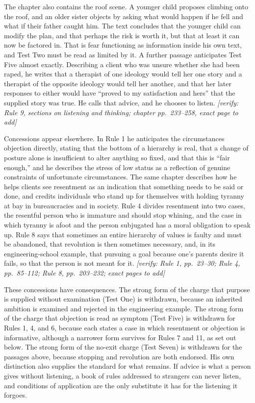 \documentclass[12pt]{article}
\newif\ifverify\verifytrue
\newcommand{\passage}[1]{\ifverify{\footnotesize\color{gray}\textit{[verify: #1]}}\fi}
\begin{document}
The chapter also contains the roof scene. A younger child proposes climbing onto the roof, and an older sister objects by asking what would happen if he fell and what if their father caught him. The text concludes that the younger child can modify the plan, and that perhaps the risk is worth it, but that at least it can now be factored in. That is fear functioning as information inside his own text, and Test Two must be read as limited by it. A further passage anticipates Test Five almost exactly. Describing a client who was unsure whether she had been raped, he writes that a therapist of one ideology would tell her one story and a therapist of the opposite ideology would tell her another, and that her later responses to either would have ``proved to my satisfaction and hers'' that the supplied story was true. He calls that advice, and he chooses to listen. \passage{Rule 9, sections on listening and thinking; chapter pp.~233--258, exact page to add}

Concessions appear elsewhere. In Rule 1 he anticipates the circumstances objection directly, stating that the bottom of a hierarchy is real, that a change of posture alone is insufficient to alter anything so fixed, and that this is ``fair enough,'' and he describes the stress of low status as a reflection of genuine constraints of unfortunate circumstances. The same chapter describes how he helps clients see resentment as an indication that something needs to be said or done, and credits individuals who stand up for themselves with holding tyranny at bay in bureaucracies and in society. Rule 4 divides resentment into two cases, the resentful person who is immature and should stop whining, and the case in which tyranny is afoot and the person subjugated has a moral obligation to speak up. Rule 8 says that sometimes an entire hierarchy of values is faulty and must be abandoned, that revolution is then sometimes necessary, and, in its engineering-school example, that pursuing a goal because one's parents desire it fails, so that the person is not meant for it. \passage{Rule 1, pp.~23--30; Rule 4, pp.~85--112; Rule 8, pp.~203--232; exact pages to add}

These concessions have consequences. The strong form of the charge that purpose is supplied without examination (Test One) is withdrawn, because an inherited ambition is examined and rejected in the engineering example. The strong form of the charge that objection is read as symptom (Test Five) is withdrawn for Rules 1, 4, and 6, because each states a case in which resentment or objection is informative, although a narrower form survives for Rules 7 and 11, as set out below. The strong form of the no-exit charge (Test Seven) is withdrawn for the passages above, because stopping and revolution are both endorsed. His own distinction also supplies the standard for what remains. If advice is what a person gives without listening, a book of rules addressed to strangers can never listen, and conditions of application are the only substitute it has for the listening it forgoes.
\end{document}
